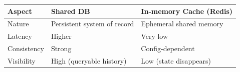 \begin{table}[h!]
  \renewcommand{\arraystretch}{1.4}
  \centering
  \begin{tabular}{lll}
    \hline
    \textbf{Aspect} & \textbf{Shared DB}          & \textbf{In-memory Cache (Redis)} \\
    \hline
    Nature          & Persistent system of record & Ephemeral shared memory          \\
    Latency         & Higher                      & Very low                         \\
    Consistency     & Strong                      & Config-dependent                 \\
    Visibility      & High (queryable history)    & Low (state disappears)           \\
    \hline
  \end{tabular}
\end{table}












